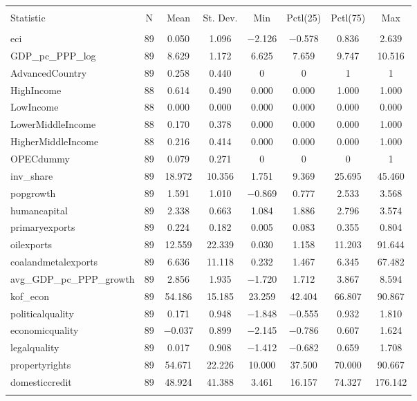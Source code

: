 
\begin{tabular}{@{\extracolsep{5pt}}lccccccc} 
\\[-1.8ex]\hline 
\hline \\[-1.8ex] 
Statistic & \multicolumn{1}{c}{N} & \multicolumn{1}{c}{Mean} & \multicolumn{1}{c}{St. Dev.} & \multicolumn{1}{c}{Min} & \multicolumn{1}{c}{Pctl(25)} & \multicolumn{1}{c}{Pctl(75)} & \multicolumn{1}{c}{Max} \\ 
\hline \\[-1.8ex] 
eci & 89 & 0.050 & 1.096 & $-$2.126 & $-$0.578 & 0.836 & 2.639 \\ 
GDP\_pc\_PPP\_log & 89 & 8.629 & 1.172 & 6.625 & 7.659 & 9.747 & 10.516 \\ 
AdvancedCountry & 89 & 0.258 & 0.440 & 0 & 0 & 1 & 1 \\ 
HighIncome & 88 & 0.614 & 0.490 & 0.000 & 0.000 & 1.000 & 1.000 \\ 
LowIncome & 88 & 0.000 & 0.000 & 0.000 & 0.000 & 0.000 & 0.000 \\ 
LowerMiddleIncome & 88 & 0.170 & 0.378 & 0.000 & 0.000 & 0.000 & 1.000 \\ 
HigherMiddleIncome & 88 & 0.216 & 0.414 & 0.000 & 0.000 & 0.000 & 1.000 \\ 
OPECdummy & 89 & 0.079 & 0.271 & 0 & 0 & 0 & 1 \\ 
inv\_share & 89 & 18.972 & 10.356 & 1.751 & 9.369 & 25.695 & 45.460 \\ 
popgrowth & 89 & 1.591 & 1.010 & $-$0.869 & 0.777 & 2.533 & 3.568 \\ 
humancapital & 89 & 2.338 & 0.663 & 1.084 & 1.886 & 2.796 & 3.574 \\ 
primaryexports & 89 & 0.224 & 0.182 & 0.005 & 0.083 & 0.355 & 0.804 \\ 
oilexports & 89 & 12.559 & 22.339 & 0.030 & 1.158 & 11.203 & 91.644 \\ 
coalandmetalexports & 89 & 6.636 & 11.118 & 0.232 & 1.467 & 6.345 & 67.482 \\ 
avg\_GDP\_pc\_PPP\_growth & 89 & 2.856 & 1.935 & $-$1.720 & 1.712 & 3.867 & 8.594 \\ 
kof\_econ & 89 & 54.186 & 15.185 & 23.259 & 42.404 & 66.807 & 90.867 \\ 
politicalquality & 89 & 0.171 & 0.948 & $-$1.848 & $-$0.555 & 0.932 & 1.810 \\ 
economicquality & 89 & $-$0.037 & 0.899 & $-$2.145 & $-$0.786 & 0.607 & 1.624 \\ 
legalquality & 89 & 0.017 & 0.908 & $-$1.412 & $-$0.682 & 0.659 & 1.708 \\ 
propertyrights & 89 & 54.671 & 22.226 & 10.000 & 37.500 & 70.000 & 90.667 \\ 
domesticcredit & 89 & 48.924 & 41.388 & 3.461 & 16.157 & 74.327 & 176.142 \\ 
\hline \\[-1.8ex] 
\end{tabular} 
